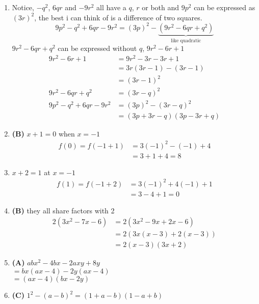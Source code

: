 \begin{multicols}{2}
\begin{enumerate}[label={\textbf{\arabic*.}}]
    \item Notice, \(-q^2\), \(6qr\) and \(-9r^2\) all have a \(q\), \(r\) or both and \(9p^2\) can be expressed as $(3r)^2$, the best i can think of is a difference of two squares. \\
    $$9p^2 - q^2 + 6qr - 9r^2 = (3p)^2 - \underbrace{(9r^2 - 6qr + q^2)}_{\text{like quadratic} }$$ 
    $9r^2 - 6qr + q^2$ can be expressed without $q$,  $9r^2 - 6r + 1$ 
    \begin{align*}
    9r^2 - 6r + 1 &= 9r^2 - 3r - 3r + 1 \\
    &= 3r(3r -1) -(3r -1) \\ 
    &= (3r -1)^2 \\
    9r^2 - 6qr + q^2  &= (3r -q)^2 \\
    9p^2 - q^2 + 6qr - 9r^2 &= (3p)^2 - (3r -q)^2 \\
    &= (3p + 3r - q)(3p - 3r + q) 
    \end{align*}

    \item \textbf{(B)} $x+1 = 0$ when $x = -1$ 
    \begin{align*} 
        f(0) = f(-1 + 1) &= 3(-1)^2 - (-1) + 4 \\
        & = 3 + 1 + 4 = 8
    \end{align*}

    \item $x+2 = 1$ at $x = -1$ 
    \begin{align*} 
        f(1) = f(-1 + 2) &= 3(-1)^2 + 4(-1) + 1 \\
        & = 3 - 4 + 1 = 0
    \end{align*}

    \item \textbf{(B)} they all share factors with 2 
     \begin{align*} 
        2(3x^2 - 7x - 6) & = 2(3x^2 - 9x + 2x -6) \\
        & = 2\left(3x(x - 3) + 2(x - 3)\right) \\
        & = 2(x-3)(3x +2)
    \end{align*}
    
    \item \textbf{(A)} $abx^2 -4bx -2axy + 8y$  \\
    $= bx(ax - 4) - 2y(ax - 4)$ \\
    $=(ax -4)(bx-2y)$

    \item \textbf{(C)} $1^2 - (a -b)^2 = (1 +a -b)(1 -a + b)$


\end{enumerate}
\end{multicols}
